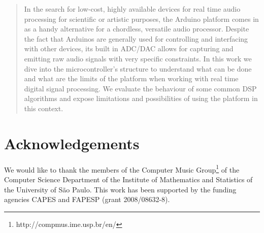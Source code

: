 \begin{abstract}


In the search for low-cost, highly available devices for real time audio
processing for scientific or artistic purposes, the Arduino platform comes in
as a handy alternative for a chordless, versatile audio processor. Despite the
fact that Arduinos are generally used for controlling and interfacing with
other devices, its built in ADC/DAC allows for capturing and emitting raw audio
signals with very specific constraints. In this work we dive into the
microcontroller's structure to understand what can be done and what are the
limits of the platform when working with real time digital signal processing.
We evaluate the behaviour of some common DSP algorithms and expose limitations
and possibilities of using the platform in this context.


\end{abstract}






\section{Acknowledgements}

We would like to thank the members of the Computer Music
Group\footnote{http://compmus.ime.usp.br/en/} of the Computer Science
Department of the Institute of Mathematics and Statistics of the University of
São Paulo. This work has been supported by the funding agencies CAPES and
FAPESP (grant 2008/08632-8).


%
\nocite{*}
%
%
%


